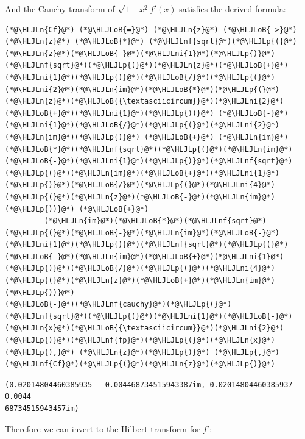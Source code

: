 \documentclass[12pt,a4paper]{article}
\newcommand{\HLJLn}[1]{#1}
\newcommand{\HLJLnf}[1]{\textcolor[RGB]{66,102,213}{#1}}
\newcommand{\HLJLni}[1]{\textcolor[RGB]{59,151,46}{#1}}
\newcommand{\HLJLoB}[1]{\textcolor[RGB]{102,102,102}{\textbf{#1}}}
\newcommand{\HLJLp}[1]{#1}
\begin{document}
And the Cauchy transform of $\sqrt{1-x^2} f'(x)$ satisfies the derived formula:


\begin{lstlisting}
(*@\HLJLn{Cf}@*) (*@\HLJLoB{=}@*) (*@\HLJLn{z}@*) (*@\HLJLoB{->}@*) (*@\HLJLn{z}@*) (*@\HLJLoB{*}@*) (*@\HLJLnf{sqrt}@*)(*@\HLJLp{(}@*)(*@\HLJLn{z}@*)(*@\HLJLoB{-}@*)(*@\HLJLni{1}@*)(*@\HLJLp{)}@*)(*@\HLJLnf{sqrt}@*)(*@\HLJLp{(}@*)(*@\HLJLn{z}@*)(*@\HLJLoB{+}@*)(*@\HLJLni{1}@*)(*@\HLJLp{)}@*)(*@\HLJLoB{/}@*)(*@\HLJLp{(}@*)(*@\HLJLni{2}@*)(*@\HLJLn{im}@*)(*@\HLJLoB{*}@*)(*@\HLJLp{(}@*)(*@\HLJLn{z}@*)(*@\HLJLoB{{\textasciicircum}}@*)(*@\HLJLni{2}@*)(*@\HLJLoB{+}@*)(*@\HLJLni{1}@*)(*@\HLJLp{))}@*) (*@\HLJLoB{-}@*) (*@\HLJLni{1}@*)(*@\HLJLoB{/}@*)(*@\HLJLp{(}@*)(*@\HLJLni{2}@*)(*@\HLJLn{im}@*)(*@\HLJLp{)}@*) (*@\HLJLoB{+}@*) (*@\HLJLn{im}@*)(*@\HLJLoB{*}@*)(*@\HLJLnf{sqrt}@*)(*@\HLJLp{(}@*)(*@\HLJLn{im}@*)(*@\HLJLoB{-}@*)(*@\HLJLni{1}@*)(*@\HLJLp{)}@*)(*@\HLJLnf{sqrt}@*)(*@\HLJLp{(}@*)(*@\HLJLn{im}@*)(*@\HLJLoB{+}@*)(*@\HLJLni{1}@*)(*@\HLJLp{)}@*)(*@\HLJLoB{/}@*)(*@\HLJLp{(}@*)(*@\HLJLni{4}@*)(*@\HLJLp{(}@*)(*@\HLJLn{z}@*)(*@\HLJLoB{-}@*)(*@\HLJLn{im}@*)(*@\HLJLp{))}@*) (*@\HLJLoB{+}@*)
         (*@\HLJLn{im}@*)(*@\HLJLoB{*}@*)(*@\HLJLnf{sqrt}@*)(*@\HLJLp{(}@*)(*@\HLJLoB{-}@*)(*@\HLJLn{im}@*)(*@\HLJLoB{-}@*)(*@\HLJLni{1}@*)(*@\HLJLp{)}@*)(*@\HLJLnf{sqrt}@*)(*@\HLJLp{(}@*)(*@\HLJLoB{-}@*)(*@\HLJLn{im}@*)(*@\HLJLoB{+}@*)(*@\HLJLni{1}@*)(*@\HLJLp{)}@*)(*@\HLJLoB{/}@*)(*@\HLJLp{(}@*)(*@\HLJLni{4}@*)(*@\HLJLp{(}@*)(*@\HLJLn{z}@*)(*@\HLJLoB{+}@*)(*@\HLJLn{im}@*)(*@\HLJLp{))}@*)
(*@\HLJLoB{-}@*)(*@\HLJLnf{cauchy}@*)(*@\HLJLp{(}@*)(*@\HLJLnf{sqrt}@*)(*@\HLJLp{(}@*)(*@\HLJLni{1}@*)(*@\HLJLoB{-}@*)(*@\HLJLn{x}@*)(*@\HLJLoB{{\textasciicircum}}@*)(*@\HLJLni{2}@*)(*@\HLJLp{)}@*)(*@\HLJLnf{fp}@*)(*@\HLJLp{(}@*)(*@\HLJLn{x}@*)(*@\HLJLp{),}@*) (*@\HLJLn{z}@*)(*@\HLJLp{)}@*) (*@\HLJLp{,}@*) (*@\HLJLnf{Cf}@*)(*@\HLJLp{(}@*)(*@\HLJLn{z}@*)(*@\HLJLp{)}@*)
\end{lstlisting}

\begin{lstlisting}
(0.02014804460385935 - 0.004468734515943387im, 0.02014804460385937 - 0.0044
68734515943457im)
\end{lstlisting}


Therefore we can invert to the Hilbert transform for $f'$:
\end{document}
